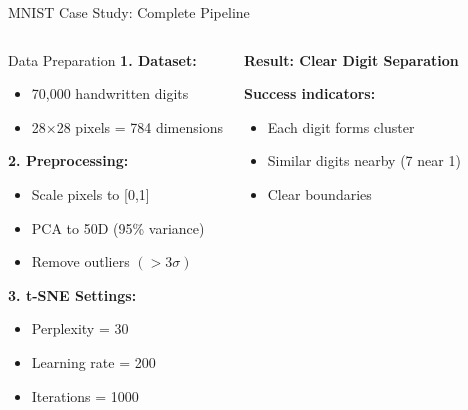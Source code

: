 \documentclass[aspectratio=169]{beamer}
\begin{document}
\begin{frame}{MNIST Case Study: Complete Pipeline}
\begin{columns}
\begin{block}{Data Preparation}
\textbf{1. Dataset:}
\begin{itemize}
\item 70,000 handwritten digits
\item 28×28 pixels = 784 dimensions
\end{itemize}

\textbf{2. Preprocessing:}
\begin{itemize}
\item Scale pixels to [0,1]
\item PCA to 50D (95\% variance)
\item Remove outliers $(>3\sigma)$
\end{itemize}

\textbf{3. t-SNE Settings:}
\begin{itemize}
\item Perplexity = 30
\item Learning rate = 200
\item Iterations = 1000
\end{itemize}
\end{block}

\begin{center}
\textbf{Result: Clear Digit Separation}\\[3mm]

\vspace{3mm}
\textbf{Success indicators:}
\begin{itemize}
\item Each digit forms cluster
\item Similar digits nearby (7 near 1)
\item Clear boundaries
\end{itemize}
\end{center}
\end{columns}
\end{frame}
\end{document}
